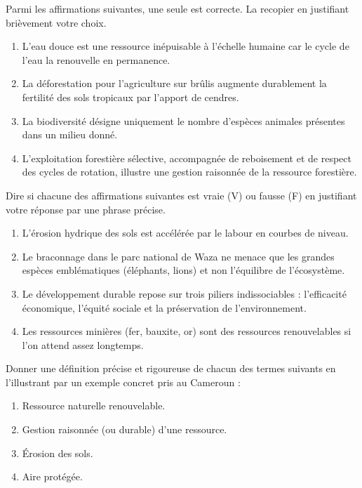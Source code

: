 \documentclass[11pt]{article}
\begin{document}
\begin{exercice}
Parmi les affirmations suivantes, une seule est correcte. La recopier en justifiant brièvement votre choix.
\begin{enumerate}
\item L'eau douce est une ressource inépuisable à l'échelle humaine car le cycle de l'eau la renouvelle en permanence.
\item La déforestation pour l'agriculture sur brûlis augmente durablement la fertilité des sols tropicaux par l'apport de cendres.
\item La biodiversité désigne uniquement le nombre d'espèces animales présentes dans un milieu donné.
\item L'exploitation forestière sélective, accompagnée de reboisement et de respect des cycles de rotation, illustre une gestion raisonnée de la ressource forestière.
\end{enumerate}
\end{exercice}

\begin{exercice}
Dire si chacune des affirmations suivantes est vraie (V) ou fausse (F) en justifiant votre réponse par une phrase précise.
\begin{enumerate}
\item L'érosion hydrique des sols est accélérée par le labour en courbes de niveau.
\item Le braconnage dans le parc national de Waza ne menace que les grandes espèces emblématiques (éléphants, lions) et non l'équilibre de l'écosystème.
\item Le développement durable repose sur trois piliers indissociables : l'efficacité économique, l'équité sociale et la préservation de l'environnement.
\item Les ressources minières (fer, bauxite, or) sont des ressources renouvelables si l'on attend assez longtemps.
\end{enumerate}
\end{exercice}

\begin{exercice}
Donner une définition précise et rigoureuse de chacun des termes suivants en l'illustrant par un exemple concret pris au Cameroun :
\begin{enumerate}
\item Ressource naturelle renouvelable.
\item Gestion raisonnée (ou durable) d'une ressource.
\item Érosion des sols.
\item Aire protégée.
\end{enumerate}
\end{exercice}
\end{document}
